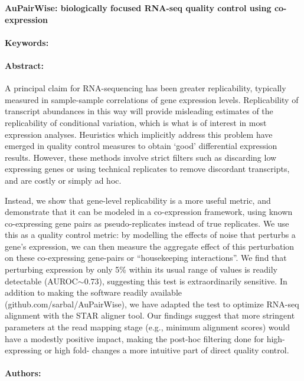 \noindent
\large {\bf AuPairWise: biologically focused RNA-seq quality control using co-expression} 


\normalsize 


\noindent \paragraph{Keywords:} 

\noindent \paragraph{Abstract:} 

A principal claim for RNA-sequencing has been greater replicability, typically measured in sample-sample
correlations of gene expression levels. Replicability of transcript abundances in this way will provide misleading
estimates of the replicability of conditional variation, which is what is of interest in most expression analyses.
Heuristics which implicitly address this problem have emerged in quality control measures to obtain ‘good’
differential expression results. However, these methods involve strict filters such as discarding low expressing
genes or using technical replicates to remove discordant transcripts, and are costly or simply ad hoc.

Instead, we show that gene-level replicability is a more useful metric, and demonstrate that it can be modeled in a
co-expression framework, using known co-expressing gene pairs as pseudo-replicates instead of true replicates.
We use this as a quality control metric: by modelling the effects of noise that perturbs a gene’s expression, we can
then measure the aggregate effect of this perturbation on these co-expressing gene-pairs or ``housekeeping
interactions''. We find that perturbing expression by only 5\% within its usual range of values is readily detectable
(AUROC$\sim$0.73), suggesting this test is extraordinarily sensitive. In addition to making the software readily available
(github.com/sarbal/AuPairWise), we have adapted the test to optimize RNA-seq alignment with the STAR aligner
tool. Our findings suggest that more stringent parameters at the read mapping stage (e.g., minimum alignment
scores) would have a modestly positive impact, making the post-hoc filtering done for high-expressing or high fold-
changes a more intuitive part of direct quality control.

\noindent \paragraph{Authors:} 

